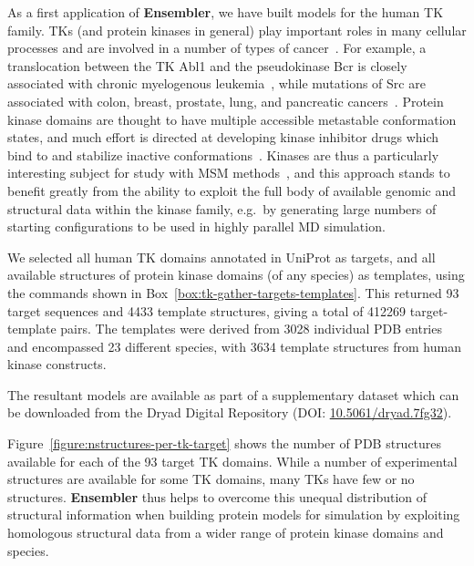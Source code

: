 \documentclass[aps,pre,twocolumn,nofootinbib,superscriptaddress,linenumbers]{revtex4-1}
\begin{document}
As a first application of {\bf Ensembler}, we have built models for the human TK family.
TKs (and protein kinases in general) play important roles in many cellular processes and are involved in a number of types of cancer~\cite{krause:nejm:2005:tks-cancer}.
For example, a translocation between the TK Abl1 and the pseudokinase Bcr is closely associated with chronic myelogenous leukemia~\cite{greuber:2013:abl-cancer-review}, while mutations of Src are associated with colon, breast, prostate, lung, and pancreatic cancers~\cite{kim:2009:src-cancer-review}.
Protein kinase domains are thought to have multiple accessible metastable conformation states, and much effort is directed at developing kinase inhibitor drugs which bind to and stabilize inactive conformations~\cite{liu:ncb:2006:kinase-inhibitors-inactive-conformations}.
Kinases are thus a particularly interesting subject for study with MSM methods~\cite{shukla-pande:nature-commun:2014:src-activation-msm}, and this approach stands to benefit greatly from the ability to exploit the full body of available genomic and structural data within the kinase family, e.g.~by generating large numbers of starting configurations to be used in highly parallel MD simulation.

We selected all human TK domains annotated in UniProt as targets, and all available structures of protein kinase domains (of any species) as templates, using the commands shown in Box~\ref{box:tk-gather-targets-templates}.
This returned 93 target sequences and 4433 template structures, giving a total of \num{412269} target-template pairs.
The templates were derived from 3028 individual PDB entries and encompassed 23 different species, with 3634 template structures from human kinase constructs.

The resultant models are available as part of a supplementary dataset which can be downloaded from the Dryad Digital Repository (DOI: \href{http://datadryad.org/review?doi=doi:10.5061/dryad.7fg32}{10.5061/dryad.7fg32}).

\color{red}
Figure~\ref{figure:nstructures-per-tk-target} shows the number of PDB structures available for each of the 93 target TK domains.
While a number of experimental structures are available for some TK domains, many TKs have few or no structures. 
{\bf Ensembler} thus helps to overcome this unequal distribution of structural information when building protein models for simulation by exploiting homologous structural data from a wider range of protein kinase domains and species.
\color{black}
\end{document}
